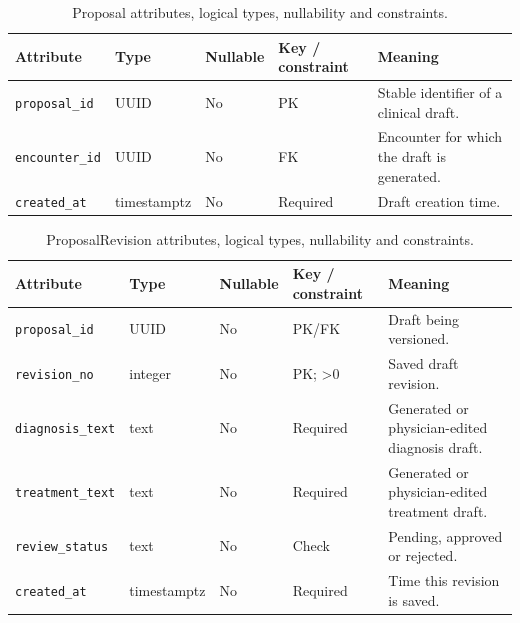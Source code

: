 \begin{table}[htbp]
\setlength{\tabcolsep}{5pt}
\centering
\small
\caption{Proposal attributes, logical types, nullability and constraints.}
\label{tab:kashaf:dict-proposal}
\begin{tabular}{|p{}|p{}|p{}|p{}|p{}|}
\hline
Attribute & Type & Nullable & Key / constraint & Meaning \\ \hline
\texttt{proposal\_id} & UUID & No & PK & Stable identifier of a clinical draft. \\ \hline
\texttt{encounter\_id} & UUID & No & FK & Encounter for which the draft is generated. \\ \hline
\texttt{created\_at} & timestamptz & No & Required & Draft creation time. \\ \hline
\end{tabular}
\end{table}

\begin{table}[htbp]
\setlength{\tabcolsep}{5pt}
\centering
\small
\caption{ProposalRevision attributes, logical types, nullability and constraints.}
\label{tab:kashaf:dict-proposalrevision}
\begin{tabular}{|p{}|p{}|p{}|p{}|p{}|}
\hline
Attribute & Type & Nullable & Key / constraint & Meaning \\ \hline
\texttt{proposal\_id} & UUID & No & PK/FK & Draft being versioned. \\ \hline
\texttt{revision\_no} & integer & No & PK; >0 & Saved draft revision. \\ \hline
\texttt{diagnosis\_text} & text & No & Required & Generated or physician-edited diagnosis draft. \\ \hline
\texttt{treatment\_text} & text & No & Required & Generated or physician-edited treatment draft. \\ \hline
\texttt{review\_status} & text & No & Check & Pending, approved or rejected. \\ \hline
\texttt{created\_at} & timestamptz & No & Required & Time this revision is saved. \\ \hline
\end{tabular}
\end{table}

